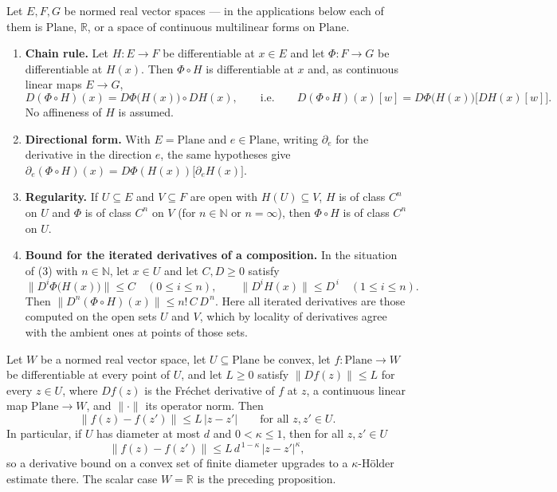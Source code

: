 \begin{proposition}
Let $E,F,G$ be normed real vector spaces --- in the applications below each of them is
$\mathrm{Plane}$, $\mathbb{R}$, or a space of continuous multilinear forms on
$\mathrm{Plane}$.
\begin{enumerate}
\item \textbf{Chain rule.}  Let $H\colon E\to F$ be differentiable at $x\in E$ and let
$\Phi\colon F\to G$ be differentiable at $H(x)$.  Then $\Phi\circ H$ is differentiable at $x$
and, as continuous linear maps $E\to G$,
\[
  D(\Phi\circ H)(x)=D\Phi\bigl(H(x)\bigr)\circ DH(x),
  \qquad\text{i.e.}\qquad
  D(\Phi\circ H)(x)[w]=D\Phi\bigl(H(x)\bigr)\bigl[DH(x)[w]\bigr].
\]
No affineness of $H$ is assumed.
\item \textbf{Directional form.}  With $E=\mathrm{Plane}$ and $e\in\mathrm{Plane}$, writing
$\partial_e$ for the derivative in the direction $e$, the same hypotheses give
$\partial_e(\Phi\circ H)(x)=D\Phi(H(x))\bigl[\partial_eH(x)\bigr]$.
\item \textbf{Regularity.}  If $U\subseteq E$ and $V\subseteq F$ are open with $H(U)\subseteq V$,
$H$ is of class $C^{n}$ on $U$ and $\Phi$ is of class $C^{n}$ on $V$ (for $n\in\mathbb{N}$ or
$n=\infty$), then $\Phi\circ H$ is of class $C^{n}$ on $U$.
\item \textbf{Bound for the iterated derivatives of a composition.}  In the situation of (3)
with $n\in\mathbb{N}$, let $x\in U$ and let $C,D\ge0$ satisfy
\[
  \bigl\lVert D^{i}\Phi\bigl(H(x)\bigr)\bigr\rVert\le C\quad(0\le i\le n),
  \qquad
  \bigl\lVert D^{i}H(x)\bigr\rVert\le D^{\,i}\quad(1\le i\le n).
\]
Then $\bigl\lVert D^{n}(\Phi\circ H)(x)\bigr\rVert\le n!\,C\,D^{\,n}$.  Here all iterated
derivatives are those computed on the open sets $U$ and $V$, which by locality of derivatives
agree with the ambient ones at points of those sets.
\end{enumerate}
\end{proposition}

\begin{proposition}
Let $W$ be a normed real vector space, let $U\subseteq\mathrm{Plane}$ be convex, let
$f\colon\mathrm{Plane}\to W$ be differentiable at every point of $U$, and let $L\ge0$ satisfy
$\lVert Df(z)\rVert\le L$ for every $z\in U$, where $Df(z)$ is the Fr\'echet derivative of $f$
at $z$, a continuous linear map $\mathrm{Plane}\to W$, and $\lVert\cdot\rVert$ its operator
norm.  Then
\[
  \lVert f(z)-f(z')\rVert\le L\,\lvert z-z'\rvert\qquad\text{for all }z,z'\in U.
\]
In particular, if $U$ has diameter at most $d$ and $0<\kappa\le1$, then for all $z,z'\in U$
\[
  \lVert f(z)-f(z')\rVert\le L\,d^{\,1-\kappa}\,\lvert z-z'\rvert^{\kappa},
\]
so a derivative bound on a convex set of finite diameter upgrades to a $\kappa$-H\"older
estimate there.  The scalar case $W=\mathbb{R}$ is the preceding proposition.
\end{proposition}

